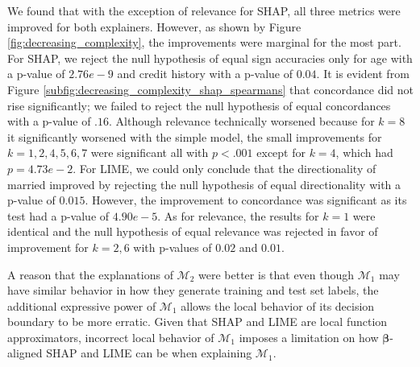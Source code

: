 \documentclass[mnsc,blindrev]{informs3}
\begin{document}
            We found that with the exception of relevance for SHAP, all three metrics were improved for both explainers. However, as shown by Figure \ref{fig:decreasing_complexity}, the improvements were marginal for the most part. For SHAP, we reject the null hypothesis of equal sign accuracies only for age with a p-value of $2.76e-9$ and credit history with a p-value of $0.04$. It is evident from Figure \ref{subfig:decreasing_complexity_shap_spearmans} that concordance did not rise significantly; we failed to reject the null hypothesis of equal concordances with a p-value of $.16$. Although relevance technically worsened because for $k=8$ it significantly worsened with the simple model, the small improvements for $k=1,2,4,5,6,7$ were significant all with $p<.001$ except for $k=4$, which had $p=4.73e-2$.%
            For LIME, we could only conclude that the directionality of married improved by rejecting the null hypothesis of equal directionality with a p-value of $0.015$. However, the improvement to concordance was significant as its test had a p-value of $4.90e-5$. As for relevance, the results for $k=1$ were identical and the null hypothesis of equal relevance was rejected in favor of improvement for $k=2,6$ with p-values of $0.02$ and $0.01$. 
            
            A reason that the explanations of $\mathcal{M}_2$ were better is that even though $\mathcal{M}_1$ may have similar behavior in how they generate training and test set labels, the additional expressive power of $\mathcal{M}_1$ allows the local behavior of its decision boundary to be more erratic. Given that SHAP and LIME are local function approximators, incorrect local behavior of $\mathcal{M}_1$ imposes a limitation on how $\boldsymbol{\beta}$-aligned SHAP and LIME can be when explaining $\mathcal{M}_1$. 
\end{document}
